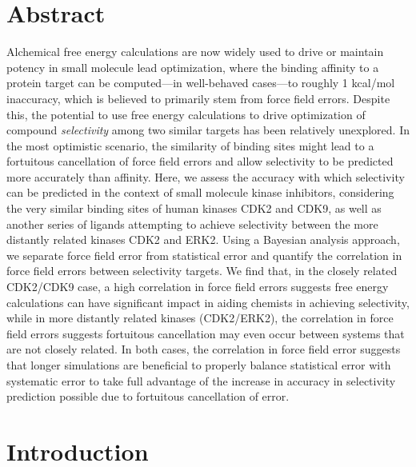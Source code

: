 \documentclass[phd,tocprelim]{cornell}
\begin{document}
\section{Abstract}
Alchemical free energy calculations are now widely used to drive or maintain potency in small molecule lead optimization, where the binding affinity to a protein target can be computed---in well-behaved cases---to roughly 1 kcal/mol inaccuracy, which is believed to primarily stem from force field errors.
Despite this, the potential to use free energy calculations to drive optimization of compound \emph{selectivity} among two similar targets has been relatively unexplored.
In the most optimistic scenario, the similarity of binding sites might lead to a fortuitous cancellation of force field errors and allow selectivity to be predicted more accurately than affinity.
Here, we assess the accuracy with which selectivity can be predicted in the context of small molecule kinase inhibitors, considering the very similar binding sites of human kinases CDK2 and CDK9, as well as another series of ligands attempting to achieve selectivity between the more distantly related kinases CDK2 and ERK2.
Using a Bayesian analysis approach, we separate force field error from statistical error and quantify the correlation in force field errors between selectivity targets.
We find that, in the closely related CDK2/CDK9 case, a high correlation in force field errors suggests free energy calculations can have significant impact in aiding chemists in achieving selectivity, while in more distantly related kinases (CDK2/ERK2), the correlation in force field errors suggests fortuitous cancellation may even occur between systems that are not closely related.  
In both cases, the correlation in force field error suggests that longer simulations are beneficial to properly balance statistical error with systematic error to take full advantage of the increase in accuracy in selectivity prediction possible due to fortuitous cancellation of error.

\section{Introduction}
\end{document}

